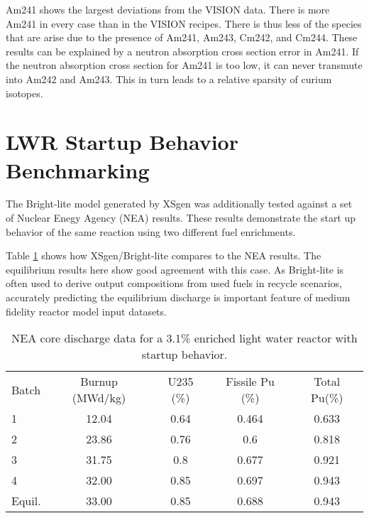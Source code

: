 \documentclass{article}
\begin{document}
Am241 shows the largest deviations from the VISION data. There is more Am241 in every
case than in the VISION recipes. There is thus less of the species that are arise due to
the presence of Am241, Am243, Cm242, and Cm244. These results can be explained by a
neutron absorption cross section error in Am241. If the neutron absorption cross section for
Am241 is too low, it can never transmute into Am242 and Am243. This in turn leads to a
relative sparsity of curium isotopes.

\section{LWR Startup Behavior Benchmarking}
The Bright-lite model generated by XSgen was additionally tested against a set of
Nuclear Enegy Agency (NEA) results\cite{nea}. These results demonstrate the start up behavior
of the same reaction using two different fuel enrichments.

Table \ref{tab:b} shows how XSgen/Bright-lite compares to the NEA results.
The equilibrium results here show good agreement with this case. As Bright-lite is often
used to derive output compositions from used fuels in recycle scenarios, accurately
predicting the equilibrium discharge is important feature of medium fidelity reactor model
input datasets.

\begin{table}[!htb]
\centering
\caption{NEA core discharge data for a 3.1\% enriched light water reactor with startup behavior.}
\label{tab:b}
\begin{tabular}{lcccc}
Batch & Burnup (MWd/kg) & U235 (\%) & Fissile Pu (\%) & Total Pu(\%) \\
1 & 12.04 & 0.64 & 0.464 & 0.633 \\
2 & 23.86 & 0.76 & 0.6 & 0.818 \\
3 & 31.75 & 0.8 & 0.677 & 0.921 \\
4 & 32.00 & 0.85 & 0.697 & 0.943 \\
Equil. & 33.00 & 0.85 & 0.688 & 0.943
\end{tabular}
\end{table}
\end{document}
